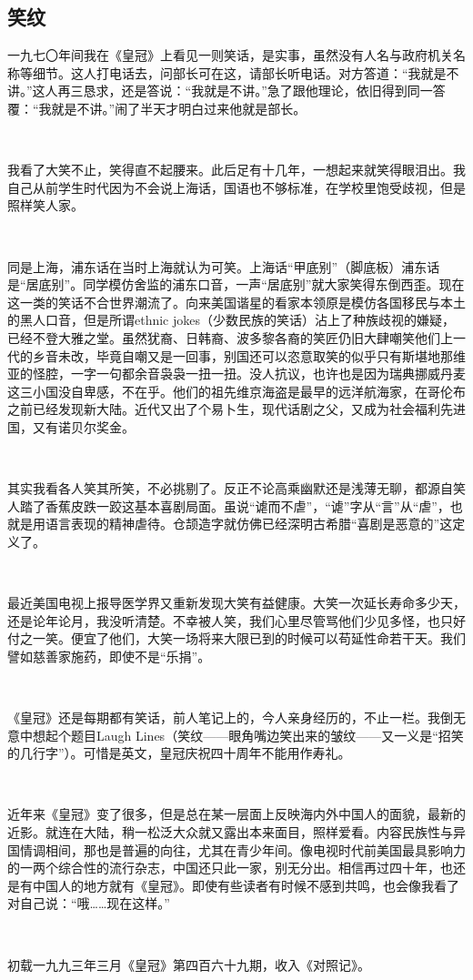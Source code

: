 \subsection{笑纹}


\par 一九七〇年间我在《皇冠》上看见一则笑话，是实事，虽然没有人名与政府机关名称等细节。这人打电话去，问部长可在这，请部长听电话。对方答道：“我就是不讲。”这人再三恳求，还是答说：“我就是不讲。”急了跟他理论，依旧得到同一答覆：“我就是不讲。”闹了半天才明白过来他就是部长。
\par  
\par 我看了大笑不止，笑得直不起腰来。此后足有十几年，一想起来就笑得眼泪出。我自己从前学生时代因为不会说上海话，国语也不够标准，在学校里饱受歧视，但是照样笑人家。
\par  
\par 同是上海，浦东话在当时上海就认为可笑。上海话“甲底别”（脚底板）浦东话是“居底别”。同学模仿舍监的浦东口音，一声“居底别”就大家笑得东倒西歪。现在这一类的笑话不合世界潮流了。向来美国谐星的看家本领原是模仿各国移民与本土的黑人口音，但是所谓ethnic jokes（少数民族的笑话）沾上了种族歧视的嫌疑，已经不登大雅之堂。虽然犹裔、日韩裔、波多黎各裔的笑匠仍旧大肆嘲笑他们上一代的乡音未改，毕竟自嘲又是一回事，别国还可以恣意取笑的似乎只有斯堪地那维亚的怪腔，一字一句都余音袅袅一扭一扭。没人抗议，也许也是因为瑞典挪威丹麦这三小国没自卑感，不在乎。他们的祖先维京海盗是最早的远洋航海家，在哥伦布之前已经发现新大陆。近代又出了个易卜生，现代话剧之父，又成为社会福利先进国，又有诺贝尔奖金。
\par  
\par 其实我看各人笑其所笑，不必挑剔了。反正不论高乘幽默还是浅薄无聊，都源自笑人踏了香蕉皮跌一跤这基本喜剧局面。虽说“谑而不虐”，“谑”字从“言”从“虐”，也就是用语言表现的精神虐待。仓颉造字就仿佛已经深明古希腊“喜剧是恶意的”这定义了。
\par  
\par 最近美国电视上报导医学界又重新发现大笑有益健康。大笑一次延长寿命多少天，还是论年论月，我没听清楚。不幸被人笑，我们心里尽管骂他们少见多怪，也只好付之一笑。便宜了他们，大笑一场将来大限已到的时候可以苟延性命若干天。我们譬如慈善家施药，即使不是“乐捐”。
\par  
\par 《皇冠》还是每期都有笑话，前人笔记上的，今人亲身经历的，不止一栏。我倒无意中想起个题目Laugh Lines（笑纹——眼角嘴边笑出来的皱纹——又一义是“招笑的几行字”）。可惜是英文，皇冠庆祝四十周年不能用作寿礼。
\par  
\par 近年来《皇冠》变了很多，但是总在某一层面上反映海内外中国人的面貌，最新的近影。就连在大陆，稍一松泛大众就又露出本来面目，照样爱看。内容民族性与异国情调相间，那也是普遍的向往，尤其在青少年间。像电视时代前美国最具影响力的一两个综合性的流行杂志，中国还只此一家，别无分出。相信再过四十年，也还是有中国人的地方就有《皇冠》。即使有些读者有时候不感到共鸣，也会像我看了对自己说：“哦……现在这样。”
\par  
\par *初载一九九三年三月《皇冠》第四百六十九期，收入《对照记》。



